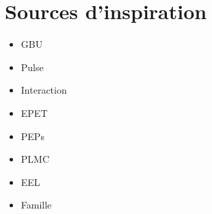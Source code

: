 \section{Sources d'inspiration}

	
	\begin{itemize}
	\item GBU %
	\item Pulse %
	\item Interaction %
	\item EPET %
	\item PEPs %
	\item PLMC
	\item EEL %
	\item Famille %
	\end{itemize}